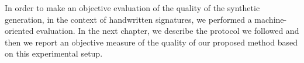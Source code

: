 In order to make an objective evaluation of the quality of the synthetic generation, in the context of handwritten signatures, we performed a machine-oriented evaluation. In the next chapter, we describe the protocol we followed and then we report an objective measure of the quality of our proposed method based on this experimental setup.
